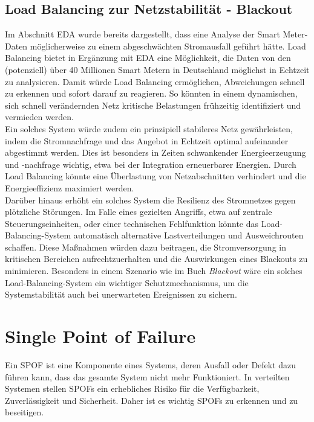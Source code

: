\documentclass[a4paper,12pt]{article}
\let\stdsection\section
\renewcommand\section{\newpage\stdsection}
\begin{document}
\subsection{Load Balancing zur Netzstabilität - Blackout}
Im Abschnitt EDA wurde bereits dargestellt, dass eine Analyse der Smart Meter-Daten möglicherweise zu einem abgeschwächten Stromausfall geführt hätte. Load Balancing bietet in Ergänzung mit EDA eine Möglichkeit, die Daten von den (potenziell) über 40 Millionen \cite{Haushalte} Smart Metern in Deutschland möglichst in Echtzeit zu analysieren. Damit würde Load Balancing ermöglichen, Abweichungen schnell zu erkennen und sofort darauf zu reagieren. So könnten in einem dynamischen, sich schnell verändernden Netz kritische Belastungen frühzeitig identifiziert und vermieden werden.\\
Ein solches System würde zudem ein prinzipiell stabileres Netz gewährleisten, indem die Stromnachfrage und das Angebot in Echtzeit optimal aufeinander abgestimmt werden. Dies ist besonders in Zeiten schwankender Energieerzeugung und -nachfrage wichtig, etwa bei der Integration erneuerbarer Energien. Durch Load Balancing könnte eine Überlastung von Netzabschnitten verhindert und die Energieeffizienz maximiert werden.\\
Darüber hinaus erhöht ein solches System die Resilienz des Stromnetzes gegen plötzliche Störungen. Im Falle eines gezielten Angriffs, etwa auf zentrale Steuerungseinheiten, oder einer technischen Fehlfunktion könnte das Load-Balancing-System automatisch alternative Lastverteilungen und Ausweichrouten schaffen. Diese Maßnahmen würden dazu beitragen, die Stromversorgung in kritischen Bereichen aufrechtzuerhalten und die Auswirkungen eines Blackouts zu minimieren. Besonders in einem Szenario wie im Buch \textit{Blackout} wäre ein solches Load-Balancing-System ein wichtiger Schutzmechanismus, um die Systemstabilität auch bei unerwarteten Ereignissen zu sichern.

\section{Single Point of Failure}

Ein SPOF ist eine Komponente eines Systems, deren Ausfall oder Defekt dazu führen kann, dass das gesamte System nicht mehr Funktioniert. In verteilten Systemen stellen SPOFs ein erhebliches Risiko für die Verfügbarkeit, Zuverlässigkeit und Sicherheit. Daher ist es wichtig SPOFs zu erkennen und zu beseitigen. 
\end{document}
